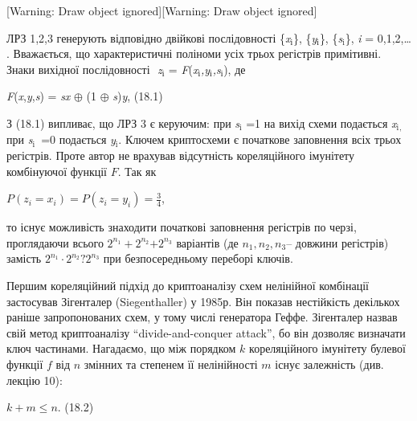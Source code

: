 \documentclass[a4paper]{article}
\newcommand\textsubscript[1]{\ensuremath{{}_{\text{#1}}}}
\newcounter{}
\begin{document}
\bigskip

[Warning: Draw object ignored][Warning: Draw object ignored]

ЛРЗ 1,2,3 генерують відповідно двійкові послідовності
\{\textit{x}\textit{\textsubscript{і}}\},
\{\textit{y}\textit{\textsubscript{і}}\},
\{\textit{s}\textit{\textsubscript{i}}\},  \textit{i} = 0,1,2,… . Вважається,
що характеристичні поліноми усіх трьох регістрів примітивні. Знаки вихідної
послідовності   $ $ \textit{z}\textit{\textsubscript{і}} =
\textit{F}(\textit{x}\textit{\textsubscript{і}}\textit{,}\textit{y}\textit{\textsubscript{і}}\textit{,}\textit{s}\textit{\textsubscript{і}}),
де


\bigskip

{\centering
\textit{ }\textit{F}(\textit{x},\textit{y},\textit{s}) = \textit{sx} ${\oplus}$
(1 ${\oplus}$  \textit{s})\textit{y},  (18.1)
\par}


\bigskip

З (18.1) випливає, що ЛРЗ 3 є керуючим:  при
\textit{s}\textit{\textsubscript{i}} =1  на вихід схеми подається 
\textit{x}\textit{\textsubscript{i}}\textsubscript{,  }при 
\textit{s}\textit{\textsubscript{i}}\textsubscript{ }=0  подається\textit{
}\textit{y}\textit{\textsubscript{i}}. Ключем криптосхеми є початкове
заповнення всіх трьох регістрів. Проте автор не врахував відсутність
кореляційного імунітету комбінуючої функції  ${F}$. Так як 

{\centering
 ${P(z_{{i}}=x_{{i}})=P(z_{{i}}=y_{{i}})=\frac{3}{4}}$,
\par}

то існує можливість знаходити початкові заповнення регістрів по черзі,
проглядаючи всього  ${2^{{n_{{1}}}}+2^{n_{{2}}}{+2^{n_{{3}}}}}$ варіантів (де 
${n_{{1}},n_{{2}},n_{{3}}}$– довжини регістрів) замість  ${2^{{n_{{1}}}}\cdot
2^{n_{{2}}}{?2^{n_{{3}}}}}$ при безпосередньому переборі ключів.

Першим кореляційний підхід до криптоаналізу схем нелінійної комбінації
застосував Зігенталер (Siegenthaller) у 1985р. Він показав нестійкість
декількох раніше запропонованих схем, у тому числі генератора Геффе. Зігенталер
назвав свій метод криптоаналізу “divide{}-and{}-conquer attack”, бо він
дозволяє визначати ключ частинами. Нагадаємо, що між порядком  ${k}$
кореляційного імунітету булевої функції  ${f}$ від  ${n}$ змінних та степенем
її нелінійності  ${m}$ існує залежність (див. лекцію 10): 


\bigskip

{\centering
  ${k+m\le n}$.  (18.2)
\par}
\end{document}
